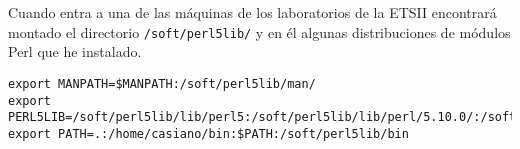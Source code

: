 
Cuando entra a una de las máquinas de los laboratorios de la ETSII
encontrará montado el directorio \verb|/soft/perl5lib/| y en 
él algunas distribuciones de módulos Perl que he instalado.

\begin{verbatim}
export MANPATH=$MANPATH:/soft/perl5lib/man/
export PERL5LIB=/soft/perl5lib/lib/perl5:/soft/perl5lib/lib/perl/5.10.0/:/soft/perl5lib/share/perl/5.10.0:/soft/perl5lib/share/perl/5.10/
export PATH=.:/home/casiano/bin:$PATH:/soft/perl5lib/bin
\end{verbatim}
%
%
%
%
%
%
%
%
%
%
%
%
%
%
%
%
%
% 
